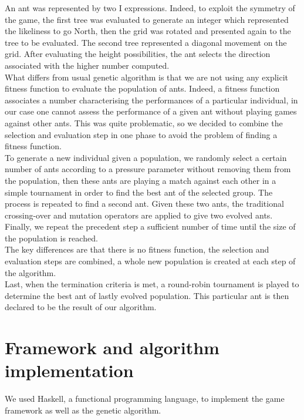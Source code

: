 \documentclass[10pt,a4paper]{article}
\begin{document}
An ant was represented by two I expressions. Indeed, to exploit the
symmetry of the game, the first tree was evaluated to generate an
integer which represented the likeliness to go North, then the grid was
rotated and presented again to the tree to be evaluated. The second
tree represented a diagonal movement on the grid. After evaluating the
height possibilities, the ant selects the direction associated with
the higher number computed.\\

What differs from usual genetic algorithm is that we are not using any
explicit fitness function to evaluate the population of ants. Indeed,
a fitness function associates a number characterising the performances
of a particular individual, in our case one cannot assess the
performance of a given ant without playing games against other
ants. This was quite problematic, so we decided to combine the
selection and evaluation step in one phase to avoid the problem of
finding a fitness function.\\

To generate a new individual given a population, we randomly select a
certain number of ants according to a pressure parameter without
removing them from the population, then these ants are playing a match
against each other in a simple tournament in order to find the best
ant of the selected group. The process is repeated to find a second
ant. Given these two ants, the traditional crossing-over and mutation
operators are applied to give two evolved ants. Finally, we repeat
the precedent step a sufficient number of time until the size of the
population is reached.\\

The key differences are that there is no fitness function, the
selection and evaluation steps are combined, a whole new population is
created at each step of the algorithm.\\

Last, when the termination criteria is met, a round-robin tournament
is played to determine the best ant of lastly evolved population. This
particular ant is then declared to be the result of our algorithm.

\section{Framework and algorithm implementation}

We used Haskell, a functional programming language, to implement the
game framework as well as the genetic algorithm.\\
\end{document}
